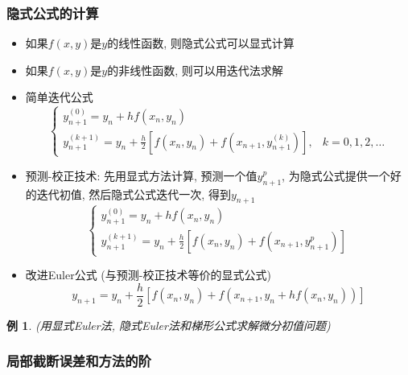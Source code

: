 \documentclass[twoside]{article}
\newtheorem{eg}{例}[section]
\begin{document}
\subsubsection{隐式公式的计算}
\begin{itemize}
  \item 如果$f(x,y)$是$y$的线性函数, 则隐式公式可以显式计算
  \item 如果$f(x,y)$是$y$的非线性函数, 则可以用迭代法求解
  \item 简单迭代公式
    \begin{equation}
      \begin{cases}{}
        y^{(0)}_{n+1} = y_n + hf(x_n,y_n)\\
        y^{(k+1)}_{n+1} = y_n + \frac{h}{2} [f(x_n, y_n)+f(x_{n+1},y^{(k)}_{n+1})], &k=0,1,2,\ldots
      \end{cases}
    \end{equation}
  \item 预测-校正技术: 先用显式方法计算, 预测一个值$y^p_{n+1}$, 为隐式公式提供一个好的迭代初值, 然后隐式公式迭代一次, 得到$y_{n+1}$
    \begin{equation}
      \begin{cases}{}
        y^{(0)}_{n+1} = y_n + hf(x_n,y_n)\\
        y^{(k+1)}_{n+1} = y_n + \frac{h}{2} [f(x_n, y_n)+f(x_{n+1},y^p_{n+1})]
      \end{cases}
    \end{equation}
  \item 改进Euler公式 (与预测-校正技术等价的显式公式)
    \begin{equation}
      y_{n+1}=y_n + \frac{h}{2} [f(x_n,y_n) + f(x_{n+1}, y_n + h f(x_n, y_n))]
    \end{equation}
\end{itemize}
\begin{eg}
  (用显式Euler法, 隐式Euler法和梯形公式求解微分初值问题)
\end{eg}
\subsubsection{局部截断误差和方法的阶}
\end{document}
